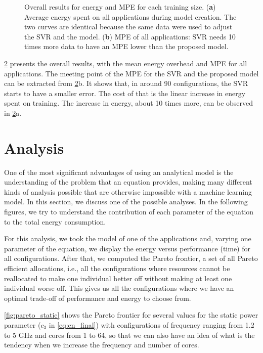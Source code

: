 \begin{figure}[H]
\begin{subfigure}[t]{0.45\textwidth}
		\caption{
		}
		\label{fig:overall_MPE}
	\end{subfigure}
	\caption{Overall results for energy and MPE for each training size. (\textbf{a}) Average energy spent on all applications during model creation. The two curves are identical because the same data were used to adjust the SVR and the model. (\textbf{b}) MPE of all applications: SVR needs 10 times more data to have an MPE lower than the proposed model.}
	\label{fig:overall_train}
\end{figure}

\cref{fig:overall_train} presents the overall results, with the mean energy overhead and MPE for all applications.
The meeting point of the MPE for the SVR and the proposed model can be extracted from \cref{fig:overall_train}b.
It shows that, in around 90 configurations, the SVR starts to have a smaller error. The cost of that is the linear increase in energy spent on training. The increase in energy, about 10 times more, can be observed in \cref{fig:overall_train}a.

\section{Analysis} \label{sec:analysis}
One of the most significant advantages of using an analytical model is the understanding of the problem that an equation provides, making many different kinds of analysis possible that are otherwise impossible with a machine learning model. In this section, we discuss one of the possible analyses. In the following figures, we try to understand the contribution of each parameter of the equation to the total energy consumption.

For this analysis, we took the model of one of the applications and, varying one parameter of the equation, we display the energy versus performance (time) for all configurations. After that, we computed the Pareto frontier, a set of all Pareto efficient allocations, i.e., all the configurations where resources cannot be reallocated to make one individual better off without making at least one individual worse off. This gives us all the configurations where we have an optimal trade-off of performance and energy to choose from.


\cref{fig:pareto_static} shows the Pareto frontier for several values for the static power parameter ($c_3$ in \cref{eq:en_final}) with configurations of frequency ranging from 1.2 to 5 GHz and cores from 1 to 64, so that we can also have an idea of what is the tendency when we increase the frequency and number of cores.

